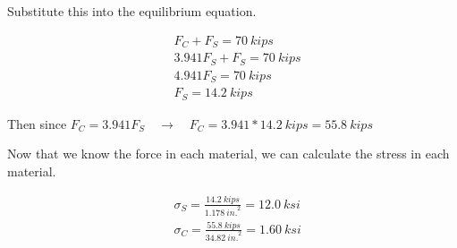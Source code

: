 \documentclass[
  letterpaper,
  DIV=11,
  numbers=noendperiod]{scrreprt}
\begin{document}
\begin{tcolorbox}
\begin{tcolorbox}
Substitute this into the equilibrium equation.

\[
\begin{aligned}
&F_C+F_S=70{~kips} \\
&3.941 F_S+F_S=70{~kips} \\
&4.941 F_S=70{~kips} \\
&F_S=14.2{~kips}
\end{aligned}
\]

Then since
\(F_C=3.941 F_S \quad\rightarrow\quad F_C=3.941 * 14.2{~kips}=55.8{~kips}\)

Now that we know the force in each material, we can calculate the stress
in each material.

\[
\begin{aligned}
& \sigma_S=\frac{14.2{~kips}}{1.178{~in.}^2}=12.0{~ksi} \\
& \sigma_C=\frac{55.8{~kips}}{34.82{~in.}^2}=1.60{~ksi}
\end{aligned}
\]

\end{tcolorbox}

\end{tcolorbox}
\end{document}
